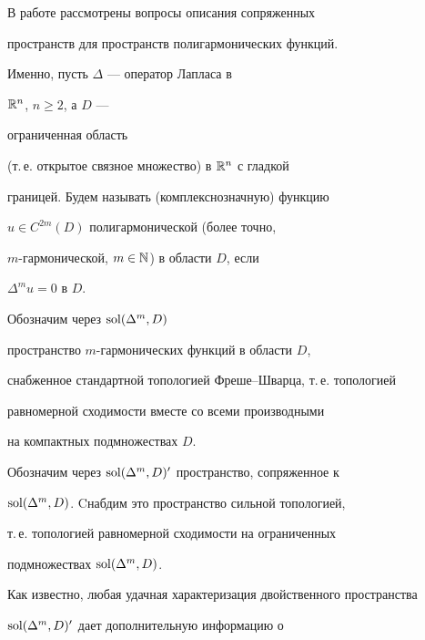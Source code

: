 \maketitle


\label{begin}








В работе рассмотрены вопросы описания сопряженных


пространств для пространств полигармонических функций.





Именно, пусть $\Delta$ --- оператор Лапласа в


${\Bbb R}^n$, $n\geq 2$, а $D$ ---


ограниченная область


(т.\,е. открытое связное множество) в ${\Bbb R}^n$ с гладкой


границей. Будем называть (комплекснозначную) функцию


$u \in C^{2m} (D)$ полигармонической (более точно,


$m$-гармонической, $m\in \Bbb N$) в области $D$, если


$\Delta ^ m u = 0$ в $D$.





Обозначим через $\operatorname{sol} (\Delta ^m,D)$


пространство $m$-гармонических функций в области $D$,


снабженное стандартной топологией Фреше--Шварца, т.\,е. топологией


равномерной сходимости вместе со всеми производными


на компактных подмножествах $D$.





Обозначим через $\operatorname{sol} (\Delta ^m, D)'$ пространство, сопряженное к


$\operatorname{sol} (\Delta ^m, D)$. Cнабдим это пространство сильной топологией,


т.\,е. топологией равномерной сходимости на ограниченных


подмножествах $\operatorname{sol} (\Delta ^m,D)$.





Как известно, любая удачная характеризация двойственного пространства


$\operatorname{sol} (\Delta ^m, D)^{\prime}$ дает дополнительную информацию о


